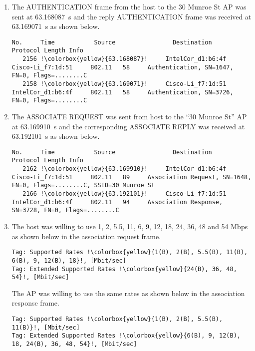 \documentclass{article}
\begin{document}
\begin{enumerate}
    \item The AUTHENTICATION frame from the host to the 30 Munroe St AP was sent at \SI{63.168087}{s} and the reply AUTHENTICATION frame was received at \SI{63.169071}{s} as shown below.
\begin{verbatim}
No.     Time           Source                Destination           Protocol Length Info
   2156 !\colorbox{yellow}{63.168087}!     IntelCor_d1:b6:4f     Cisco-Li_f7:1d:51     802.11   58     Authentication, SN=1647, FN=0, Flags=........C
   2158 !\colorbox{yellow}{63.169071}!     Cisco-Li_f7:1d:51     IntelCor_d1:b6:4f     802.11   58     Authentication, SN=3726, FN=0, Flags=........C
\end{verbatim}

    \item The ASSOCIATE REQUEST was sent from host to the ``30 Munroe St'' AP at \SI{63.169910}{s} and the corresponding ASSOCIATE REPLY was received at \SI{63.192101}{s} as shown below.
\begin{verbatim}
No.     Time           Source                Destination           Protocol Length Info
   2162 !\colorbox{yellow}{63.169910}!     IntelCor_d1:b6:4f     Cisco-Li_f7:1d:51     802.11   89     Association Request, SN=1648, FN=0, Flags=........C, SSID=30 Munroe St
   2166 !\colorbox{yellow}{63.192101}!     Cisco-Li_f7:1d:51     IntelCor_d1:b6:4f     802.11   94     Association Response, SN=3728, FN=0, Flags=........C
\end{verbatim}

    \item The host was willing to use 1, 2, 5.5, 11, 6, 9, 12, 18, 24, 36, 48 and 54 Mbps as shown below in the association request frame.
\begin{verbatim}
Tag: Supported Rates !\colorbox{yellow}{1(B), 2(B), 5.5(B), 11(B), 6(B), 9, 12(B), 18}!, [Mbit/sec]
Tag: Extended Supported Rates !\colorbox{yellow}{24(B), 36, 48, 54}!, [Mbit/sec]
\end{verbatim}
    The AP was willing to use the same rates as shown below in the association response frame.
\begin{verbatim}
Tag: Supported Rates !\colorbox{yellow}{1(B), 2(B), 5.5(B), 11(B)}!, [Mbit/sec]
Tag: Extended Supported Rates !\colorbox{yellow}{6(B), 9, 12(B), 18, 24(B), 36, 48, 54}!, [Mbit/sec]
\end{verbatim}


\end{enumerate}
\end{document}

